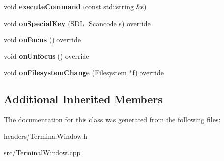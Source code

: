 \begin{DoxyCompactItemize}
\hypertarget{class_terminal_window_a7c3057b502b117dcfd763e786a482e6b}{}\label{class_terminal_window_a7c3057b502b117dcfd763e786a482e6b} 
void {\bfseries execute\+Command} (const std\+::string \&s)
\item 
\hypertarget{class_terminal_window_a81e9b81579f3fd8dc6c280d6559624de}{}\label{class_terminal_window_a81e9b81579f3fd8dc6c280d6559624de} 
void {\bfseries on\+Special\+Key} (S\+D\+L\+\_\+\+Scancode s) override
\item 
\hypertarget{class_terminal_window_af0ab0a2830652ce7ae40e0ffbc9ee482}{}\label{class_terminal_window_af0ab0a2830652ce7ae40e0ffbc9ee482} 
void {\bfseries on\+Focus} () override
\item 
\hypertarget{class_terminal_window_a7990b694e414bbf6ce3316acb3e827b9}{}\label{class_terminal_window_a7990b694e414bbf6ce3316acb3e827b9} 
void {\bfseries on\+Unfocus} () override
\item 
\hypertarget{class_terminal_window_a85692de7d9dbaeabf1787e30d7747728}{}\label{class_terminal_window_a85692de7d9dbaeabf1787e30d7747728} 
void {\bfseries on\+Filesystem\+Change} (\hyperlink{class_filesystem}{Filesystem} $\ast$f) override
\end{DoxyCompactItemize}
\subsection*{Additional Inherited Members}


The documentation for this class was generated from the following files\+:\begin{DoxyCompactItemize}
\item 
headers/Terminal\+Window.\+h\item 
src/Terminal\+Window.\+cpp\end{DoxyCompactItemize}
